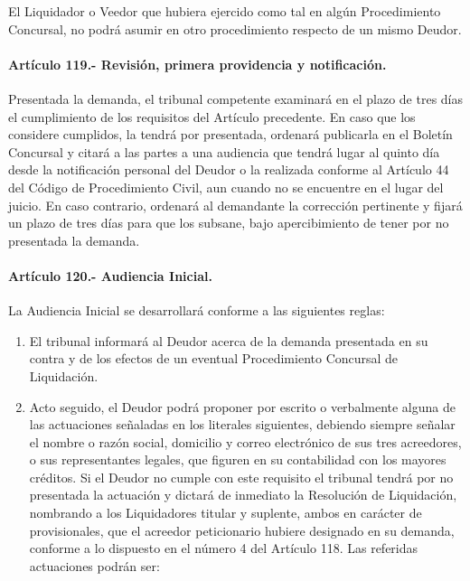 \documentclass[
]{book}
\begin{document}
El Liquidador o Veedor que hubiera ejercido como tal en algún Procedimiento Concursal, no podrá asumir en otro procedimiento respecto de un mismo Deudor.

\hypertarget{artuxedculo-119.--revisiuxf3n-primera-providencia-y-notificaciuxf3n.}{%
\paragraph*{Artículo 119.- Revisión, primera providencia y notificación.}\label{artuxedculo-119.--revisiuxf3n-primera-providencia-y-notificaciuxf3n.}}

Presentada la demanda, el tribunal competente examinará en el plazo de tres días el cumplimiento de los requisitos del Artículo precedente. En caso que los considere cumplidos, la tendrá por presentada, ordenará publicarla en el Boletín Concursal y citará a las partes a una audiencia que tendrá lugar al quinto día desde la notificación personal del Deudor o la realizada conforme al Artículo 44 del Código de Procedimiento Civil, aun cuando no se encuentre en el lugar del juicio. En caso contrario, ordenará al demandante la corrección pertinente y fijará un plazo de tres días para que los subsane, bajo apercibimiento de tener por no presentada la demanda.

\hypertarget{artuxedculo-120.--audiencia-inicial.}{%
\paragraph*{Artículo 120.- Audiencia Inicial.}\label{artuxedculo-120.--audiencia-inicial.}}

La Audiencia Inicial se desarrollará conforme a las siguientes reglas:

\begin{enumerate}
\def\labelenumi{\arabic{enumi})}
\item
  El tribunal informará al Deudor acerca de la demanda presentada en su contra y de los efectos de un eventual Procedimiento Concursal de Liquidación.
\item
  Acto seguido, el Deudor podrá proponer por escrito o verbalmente alguna de las actuaciones señaladas en los literales siguientes, debiendo siempre señalar el nombre o razón social, domicilio y correo electrónico de sus tres acreedores, o sus representantes legales, que figuren en su contabilidad con los mayores créditos. Si el Deudor no cumple con este requisito el tribunal tendrá por no presentada la actuación y dictará de inmediato la Resolución de Liquidación, nombrando a los Liquidadores titular y suplente, ambos en carácter de provisionales, que el acreedor peticionario hubiere designado en su demanda, conforme a lo dispuesto en el número 4 del Artículo 118. Las referidas actuaciones podrán ser:
\end{enumerate}
\end{document}
